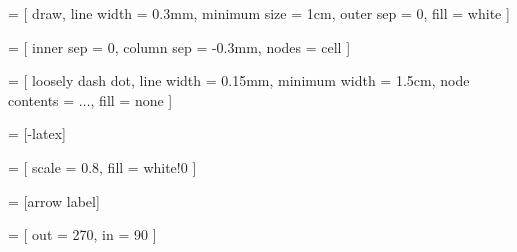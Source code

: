  = [
  draw,
  line width = 0.3mm,
  minimum size = 1cm,
  outer sep = 0,
  fill = white
]

 = [
  inner sep = 0,
  column sep = -0.3mm,
  nodes = cell
]

 = [
  loosely dash dot,
  line width = 0.15mm,
  minimum width = 1.5cm,
  node contents = $\ldots$,
  fill = none
]

\newcommand{\ellipsis}{ \node [ellipsis]; }

 = [-latex]

 = [
  scale = 0.8,
  fill = white!0
]

 = [arrow label]

 = [
  out = 270,
  in = 90
]
